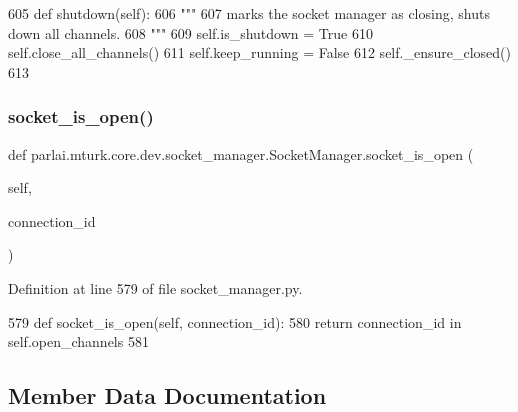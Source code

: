\begin{DoxyCode}
605     \textcolor{keyword}{def }shutdown(self):
606         \textcolor{stringliteral}{"""}
607 \textcolor{stringliteral}{        marks the socket manager as closing, shuts down all channels.}
608 \textcolor{stringliteral}{        """}
609         self.is\_shutdown = \textcolor{keyword}{True}
610         self.close\_all\_channels()
611         self.keep\_running = \textcolor{keyword}{False}
612         self.\_ensure\_closed()
613 \end{DoxyCode}
\mbox{\label{classparlai_1_1mturk_1_1core_1_1dev_1_1socket__manager_1_1SocketManager_a2f0680695682a1bf6824efe6626d9dc6}} 
\subsubsection{\texorpdfstring{socket\+\_\+is\+\_\+open()}{socket\_is\_open()}}
{\footnotesize\ttfamily def parlai.\+mturk.\+core.\+dev.\+socket\+\_\+manager.\+Socket\+Manager.\+socket\+\_\+is\+\_\+open (\begin{DoxyParamCaption}\item[{}]{self,  }\item[{}]{connection\+\_\+id }\end{DoxyParamCaption})}



Definition at line 579 of file socket\+\_\+manager.\+py.


\begin{DoxyCode}
579     \textcolor{keyword}{def }socket\_is\_open(self, connection\_id):
580         \textcolor{keywordflow}{return} connection\_id \textcolor{keywordflow}{in} self.open\_channels
581 
\end{DoxyCode}


\subsection{Member Data Documentation}
\mbox{\label{classparlai_1_1mturk_1_1core_1_1dev_1_1socket__manager_1_1SocketManager_a853eb0d94f86024bb140644e0a003946}} 
